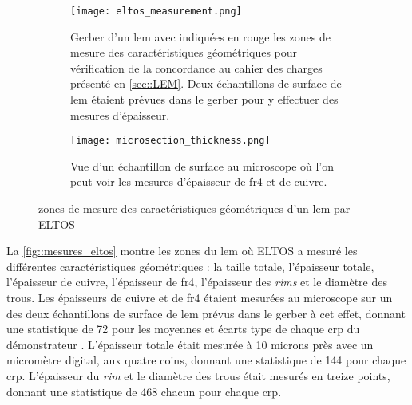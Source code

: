         \begin{figure}[!htb]
          \begin{subfigure}[t]{0.68\textwidth}
            \texttt{[image: eltos\_measurement.png]}
            \caption{Gerber d'un \gls{lem} avec indiquées en rouge les zones de mesure des caractéristiques géométriques pour vérification de la concordance au cahier des charges présenté en \autoref{sec::LEM}. Deux échantillons de surface de \gls{lem} étaient prévues dans le gerber pour y effectuer des mesures d'épaisseur.}
          \end{subfigure}
          \hfill
          \begin{subfigure}[t]{0.3\textwidth}
            \texttt{[image: microsection\_thickness.png]}
            \caption{\label{fig::microsection}Vue d'un échantillon de surface au microscope où l'on peut voir les mesures d'épaisseur de \gls{fr4} et de cuivre.}
          \end{subfigure}
          \caption[Zones de mesuredes caractéristiques géométriques d'un LEM par ELTOS]{\label{fig::mesures_eltos}zones de mesure des caractéristiques géométriques d'un \gls{lem} par ELTOS}
        \end{figure}
            
        La \autoref{fig::mesures_eltos} montre les zones du \gls{lem} où ELTOS a mesuré les différentes caractéristiques géométriques : la taille totale, l'épaisseur totale, l'épaisseur de cuivre, l'épaisseur de \gls{fr4}, l'épaisseur des \textit{rims} et le diamètre des trous. Les épaisseurs de cuivre et de \gls{fr4} étaient mesurées au microscope sur un des deux échantillons de surface de \gls{lem} prévus dans le gerber à cet effet, donnant une statistique de 72 pour les moyennes et écarts type de chaque \gls{crp} du démonstrateur \SSS{}. L'épaisseur totale était mesurée à 10 microns près avec un micromètre digital, aux quatre coins, donnant une statistique de 144 pour chaque \gls{crp}. L'épaisseur du \textit{rim} et le diamètre des trous était mesurés en treize points, donnant une statistique de 468 chacun pour chaque \gls{crp}.
                
                

